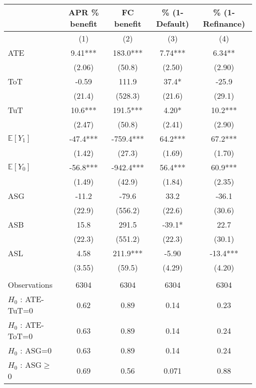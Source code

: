 \begin{tabular}{lcccc}
\toprule
      & APR \% benefit & FC benefit & \% (1-Default) & \% (1-Refinance) \\
\midrule
      & (1)   & (2)   & (3)   & (4) \\
\midrule
\midrule
ATE   & 9.41*** & 183.0*** & 7.74*** & 6.34** \\
      & (2.06) & (50.8) & (2.50) & (2.90) \\
ToT   & -0.59 & 111.9 & 37.4* & -25.9 \\
      & (21.4) & (528.3) & (21.6) & (29.1) \\
TuT   & 10.6*** & 191.5*** & 4.20* & 10.2*** \\
      & (2.47) & (50.8) & (2.41) & (2.90) \\
$\mathbb{E}[Y_1]$ & -47.4*** & -759.4*** & 64.2*** & 67.2*** \\
      & (1.42) & (27.3) & (1.69) & (1.70) \\
$\mathbb{E}[Y_0]$ & -56.8*** & -942.4*** & 56.4*** & 60.9*** \\
      & (1.49) & (42.9) & (1.84) & (2.35) \\
\midrule
ASG   & -11.2 & -79.6 & 33.2  & -36.1 \\
      & (22.9) & (556.2) & (22.6) & (30.6) \\
ASB   & 15.8  & 291.5 & -39.1* & 22.7 \\
      & (22.3) & (551.2) & (22.3) & (30.1) \\
ASL   & 4.58  & 211.9*** & -5.90 & -13.4*** \\
      & (3.55) & (59.5) & (4.29) & (4.20) \\
      &       &       &       &  \\
\midrule
Observations & 6304  & 6304  & 6304  & 6304 \\
$H_0$ : ATE-TuT=0 & 0.62  & 0.89  & 0.14  & 0.23 \\
$H_0$ : ATE-ToT=0 & 0.63  & 0.89  & 0.14  & 0.24 \\
$H_0$ : ASG=0 & 0.63  & 0.89  & 0.14  & 0.24 \\
$H_0$ : ASG$\geq$ 0 & 0.69  & 0.56  & 0.071 & 0.88 \\
\bottomrule
\bottomrule
\end{tabular}%
